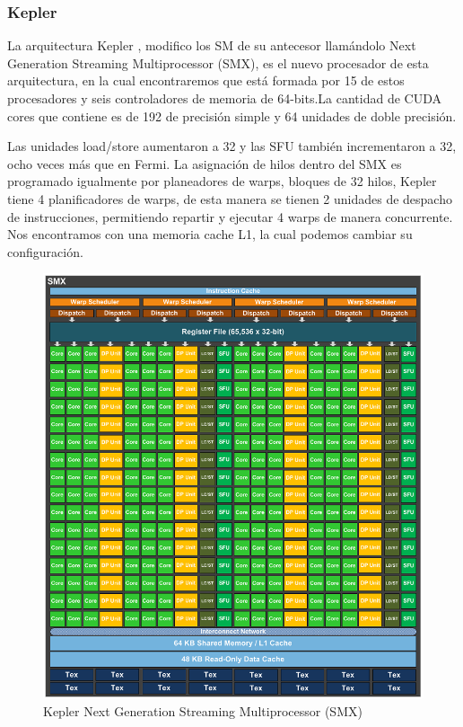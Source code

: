 \subsubsection{Kepler}

La arquitectura Kepler \cite{Kepler}, modifico los SM de su antecesor llamándolo Next Generation Streaming Multiprocessor (SMX), es el nuevo procesador de esta arquitectura, en la cual encontraremos que está formada por 15 de estos procesadores y seis controladores de memoria de 64-bits.La cantidad de CUDA cores que contiene es de 192 de precisión simple y 64 unidades de doble precisión. 

Las unidades load/store aumentaron a 32 y las SFU también incrementaron a 32, ocho veces más que en Fermi. La asignación de hilos dentro del SMX es programado igualmente por planeadores de warps, bloques de 32 hilos, Kepler tiene 4 planificadores de warps, de esta manera se tienen 2 unidades de despacho de instrucciones, permitiendo repartir y ejecutar 4 warps de manera concurrente. Nos encontramos con una memoria cache L1, la cual podemos cambiar su configuración. 

\begin{figure}[ph]
			\centering
				\includegraphics[scale=0.4]{img/KeplerSMX.png}
			\caption{Kepler Next Generation Streaming Multiprocessor (SMX) \cite{Kepler}}
\end{figure}


